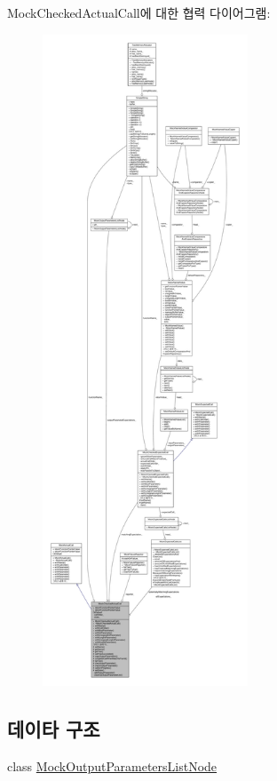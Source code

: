 Mock\+Checked\+Actual\+Call에 대한 협력 다이어그램\+:
\nopagebreak
\begin{figure}[H]
\begin{center}
\leavevmode
\includegraphics[height=550pt]{class_mock_checked_actual_call__coll__graph}
\end{center}
\end{figure}
\subsection*{데이타 구조}
\begin{DoxyCompactItemize}
\item 
class \hyperlink{class_mock_checked_actual_call_1_1_mock_output_parameters_list_node}{Mock\+Output\+Parameters\+List\+Node}
\end{DoxyCompactItemize}
